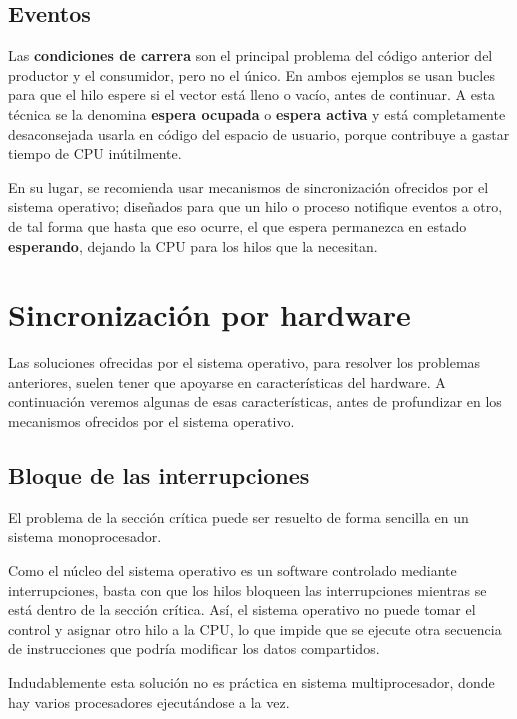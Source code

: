 \subsection{Eventos}\label{_eventos}

Las \textbf{condiciones de carrera} son el principal problema del código
anterior del productor y el consumidor, pero no el único. En ambos
ejemplos se usan bucles para que el hilo espere si el vector está lleno
o vacío, antes de continuar. A esta técnica se la denomina
\textbf{espera ocupada}{} o \textbf{espera activa}{} y está
completamente desaconsejada usarla en código del espacio de usuario,
porque contribuye a gastar tiempo de CPU inútilmente.

En su lugar, se recomienda usar mecanismos de sincronización ofrecidos
por el sistema operativo; diseñados para que un hilo o proceso notifique
eventos a otro, de tal forma que hasta que eso ocurre, el que espera
permanezca en estado \textbf{esperando}, dejando la CPU para los hilos
que la necesitan.

\section{Sincronización por
hardware}\label{_sincronizaciuxf3n_por_hardware}

Las soluciones ofrecidas por el sistema operativo, para resolver los
problemas anteriores, suelen tener que apoyarse en características del
hardware. A continuación veremos algunas de esas características, antes
de profundizar en los mecanismos ofrecidos por el sistema operativo.

\subsection{Bloque de las
interrupciones}\label{_bloque_de_las_interrupciones}

El problema de la sección crítica puede ser resuelto de forma sencilla
en un sistema monoprocesador.

Como el núcleo del sistema operativo es un software controlado mediante
interrupciones, basta con que los hilos bloqueen las interrupciones
mientras se está dentro de la sección crítica. Así, el sistema operativo
no puede tomar el control y asignar otro hilo a la CPU, lo que impide
que se ejecute otra secuencia de instrucciones que podría modificar los
datos compartidos.

Indudablemente esta solución no es práctica en sistema multiprocesador,
donde hay varios procesadores ejecutándose a la vez.

